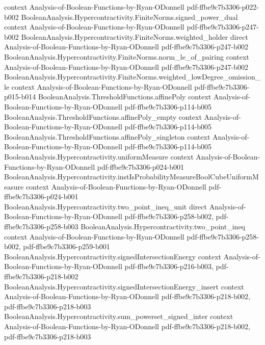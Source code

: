 \begin{theorem}
  {context}
  {Analysis-of-Boolean-Functions-by-Ryan-ODonnell}
  {pdf-ffbe9c7b3306-p022-b002}
\proofstep
  {BooleanAnalysis.Hypercontractivity.FiniteNorms.signed_power_dual}
  {context}
  {Analysis-of-Boolean-Functions-by-Ryan-ODonnell}
  {pdf-ffbe9c7b3306-p247-b002}
\proofstep
  {BooleanAnalysis.Hypercontractivity.FiniteNorms.weighted_holder}
  {direct}
  {Analysis-of-Boolean-Functions-by-Ryan-ODonnell}
  {pdf-ffbe9c7b3306-p247-b002}
\proofstep
  {BooleanAnalysis.Hypercontractivity.FiniteNorms.norm_le_of_pairing}
  {context}
  {Analysis-of-Boolean-Functions-by-Ryan-ODonnell}
  {pdf-ffbe9c7b3306-p247-b002}
\proofstep
  {BooleanAnalysis.Hypercontractivity.FiniteNorms.weighted_lowDegree_omission_le}
  {context}
  {Analysis-of-Boolean-Functions-by-Ryan-ODonnell}
  {pdf-ffbe9c7b3306-p015-b014}
\proofstep
  {BooleanAnalysis.ThresholdFunctions.affinePoly}
  {context}
  {Analysis-of-Boolean-Functions-by-Ryan-ODonnell}
  {pdf-ffbe9c7b3306-p114-b005}
\proofstep
  {BooleanAnalysis.ThresholdFunctions.affinePoly_empty}
  {context}
  {Analysis-of-Boolean-Functions-by-Ryan-ODonnell}
  {pdf-ffbe9c7b3306-p114-b005}
\proofstep
  {BooleanAnalysis.ThresholdFunctions.affinePoly_singleton}
  {context}
  {Analysis-of-Boolean-Functions-by-Ryan-ODonnell}
  {pdf-ffbe9c7b3306-p114-b005}
\proofstep
  {BooleanAnalysis.Hypercontractivity.uniformMeasure}
  {context}
  {Analysis-of-Boolean-Functions-by-Ryan-ODonnell}
  {pdf-ffbe9c7b3306-p024-b001}
\proofstep
  {BooleanAnalysis.Hypercontractivity.instIsProbabilityMeasureBoolCubeUniformMeasure}
  {context}
  {Analysis-of-Boolean-Functions-by-Ryan-ODonnell}
  {pdf-ffbe9c7b3306-p024-b001}
\proofstep
  {BooleanAnalysis.Hypercontractivity.two_point_ineq_unit}
  {direct}
  {Analysis-of-Boolean-Functions-by-Ryan-ODonnell}
  {pdf-ffbe9c7b3306-p258-b002,
    pdf-ffbe9c7b3306-p258-b003}
\proofstep
  {BooleanAnalysis.Hypercontractivity.two_point_ineq}
  {context}
  {Analysis-of-Boolean-Functions-by-Ryan-ODonnell}
  {pdf-ffbe9c7b3306-p258-b002,
    pdf-ffbe9c7b3306-p259-b001}
\proofstep
  {BooleanAnalysis.Hypercontractivity.signedIntersectionEnergy}
  {context}
  {Analysis-of-Boolean-Functions-by-Ryan-ODonnell}
  {pdf-ffbe9c7b3306-p216-b003,
    pdf-ffbe9c7b3306-p218-b002}
\proofstep
  {BooleanAnalysis.Hypercontractivity.signedIntersectionEnergy_insert}
  {context}
  {Analysis-of-Boolean-Functions-by-Ryan-ODonnell}
  {pdf-ffbe9c7b3306-p218-b002,
    pdf-ffbe9c7b3306-p218-b003}
\proofstep
  {BooleanAnalysis.Hypercontractivity.sum_powerset_signed_inter}
  {context}
  {Analysis-of-Boolean-Functions-by-Ryan-ODonnell}
  {pdf-ffbe9c7b3306-p218-b002,
    pdf-ffbe9c7b3306-p218-b003}

\end{theorem}
